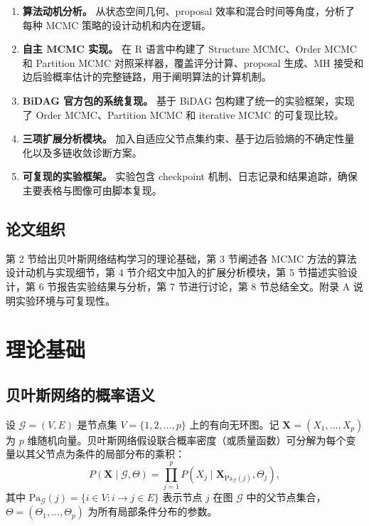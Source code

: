 \documentclass[UTF8,a4paper,12pt]{ctexart}
\begin{document}
\begin{enumerate}
  \item \textbf{算法动机分析。} 从状态空间几何、proposal 效率和混合时间等角度，分析了每种 MCMC 策略的设计动机和内在逻辑。
  \item \textbf{自主 MCMC 实现。} 在 R 语言中构建了 Structure MCMC、Order MCMC 和 Partition MCMC 对照采样器，覆盖评分计算、proposal 生成、MH 接受和边后验概率估计的完整链路，用于阐明算法的计算机制。
  \item \textbf{BiDAG 官方包的系统复现。} 基于 BiDAG 包构建了统一的实验框架，实现了 Order MCMC、Partition MCMC 和 iterative MCMC 的可复现比较。
  \item \textbf{三项扩展分析模块。} 加入自适应父节点集约束、基于边后验熵的不确定性量化以及多链收敛诊断方案。
  \item \textbf{可复现的实验框架。} 实验包含 checkpoint 机制、日志记录和结果追踪，确保主要表格与图像可由脚本复现。
\end{enumerate}

\subsection{论文组织}

第 2 节给出贝叶斯网络结构学习的理论基础，第 3 节阐述各 MCMC 方法的算法设计动机与实现细节，第 4 节介绍文中加入的扩展分析模块，第 5 节描述实验设计，第 6 节报告实验结果与分析，第 7 节进行讨论，第 8 节总结全文。附录 A 说明实验环境与可复现性。

\FloatBarrier
\newpage
\section{理论基础}

\subsection{贝叶斯网络的概率语义}

设 $\mathcal{G} = (V, E)$ 是节点集 $V = \{1, 2, \ldots, p\}$ 上的有向无环图。记 $\mathbf{X} = (X_1, \ldots, X_p)$ 为 $p$ 维随机向量。贝叶斯网络假设联合概率密度（或质量函数）可分解为每个变量以其父节点为条件的局部分布的乘积：
\begin{equation}\label{eq:factorization}
P(\mathbf{X} \mid \mathcal{G}, \Theta) = \prod_{j=1}^{p} P(X_j \mid \mathbf{X}_{\mathrm{Pa}_{\mathcal{G}}(j)}, \Theta_j),
\end{equation}
其中 $\mathrm{Pa}_{\mathcal{G}}(j) = \{i \in V : i \to j \in E\}$ 表示节点 $j$ 在图 $\mathcal{G}$ 中的父节点集合，$\Theta = (\Theta_1, \ldots, \Theta_p)$ 为所有局部条件分布的参数。
\end{document}

